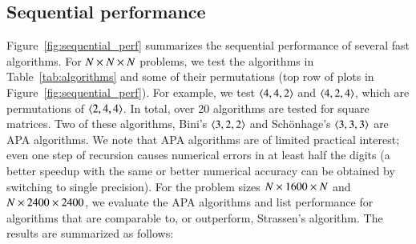 \documentclass[preprint]{sigplanconf}
\begin{document}
\subsection{Sequential performance}
\label{sec:perf_sequential}

Figure~\ref{fig:sequential_perf} summarizes the sequential performance of several fast algorithms.
For $N \times N \times N$ problems, we test the algorithms in Table~\ref{tab:algorithms} and some of their permutations (top row of plots in Figure~\ref{fig:sequential_perf}).
For example, we test $\left\langle4, 4, 2\right\rangle$ and $\left\langle4, 2, 4\right\rangle$, which are permutations of $\left\langle2, 4, 4\right\rangle$.
In total, over 20 algorithms are tested for square matrices.
Two of these algorithms, Bini's $\left\langle3, 2, 2\right\rangle$ and Sch\"{o}nhage's $\left\langle3, 3, 3\right\rangle$ are APA algorithms.
We note that APA algorithms are of limited practical interest; even one step of recursion causes numerical errors in at least half the digits (a better speedup with the same or better numerical accuracy can be obtained by switching to single precision).
For the problem sizes $N \times 1600 \times N$ and $N \times 2400 \times 2400$, we evaluate the APA algorithms and list performance for algorithms that are comparable to, or outperform, Strassen's algorithm.
The results are summarized as follows:
\end{document}
